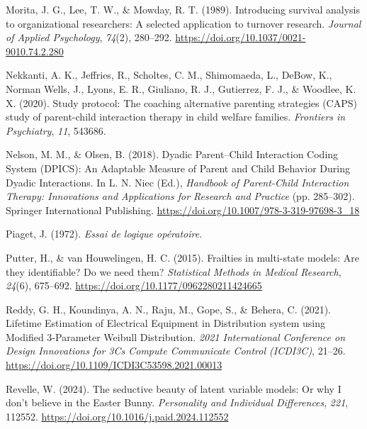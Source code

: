 \documentclass[12pt]{./styles/outhesis}
\begin{document}
\leavevmode{}%
Morita, J. G., Lee, T. W., \& Mowday, R. T. (1989). Introducing survival
analysis to organizational researchers: {A} selected application to
turnover research. \emph{Journal of Applied Psychology}, \emph{74}(2),
280--292. \url{https://doi.org/10.1037/0021-9010.74.2.280}

\leavevmode{}%
Nekkanti, A. K., Jeffries, R., Scholtes, C. M., Shimomaeda, L., DeBow,
K., Norman Wells, J., Lyons, E. R., Giuliano, R. J., Gutierrez, F. J.,
\& Woodlee, K. X. (2020). Study protocol: {The} coaching alternative
parenting strategies ({CAPS}) study of parent-child interaction therapy
in child welfare families. \emph{Frontiers in Psychiatry}, \emph{11},
543686.

\leavevmode{}%
Nelson, M. M., \& Olsen, B. (2018). Dyadic {Parent}--{Child Interaction
Coding System} ({DPICS}): {An Adaptable Measure} of {Parent} and {Child
Behavior During Dyadic Interactions}. In L. N. Niec (Ed.),
\emph{Handbook of {Parent-Child Interaction Therapy}: {Innovations} and
{Applications} for {Research} and {Practice}} (pp. 285--302). Springer
International Publishing.
\url{https://doi.org/10.1007/978-3-319-97698-3_18}

\leavevmode{}%
Piaget, J. (1972). \emph{Essai de logique op{é}ratoire}.

\leavevmode{}%
Putter, H., \& van Houwelingen, H. C. (2015). Frailties in multi-state
models: {Are} they identifiable? {Do} we need them? \emph{Statistical
Methods in Medical Research}, \emph{24}(6), 675--692.
\url{https://doi.org/10.1177/0962280211424665}

\leavevmode{}%
Reddy, G. H., Koundinya, A. N., Raju, M., Gope, S., \& Behera, C.
(2021). Lifetime {Estimation} of {Electrical Equipment} in
{Distribution} system using {Modified} 3-{Parameter Weibull
Distribution}. \emph{2021 {International Conference} on {Design
Innovations} for {3Cs Compute Communicate Control} ({ICDI3C})}, 21--26.
\url{https://doi.org/10.1109/ICDI3C53598.2021.00013}

\leavevmode{}%
Revelle, W. (2024). The seductive beauty of latent variable models: {Or}
why {I} don't believe in the {Easter Bunny}. \emph{Personality and
Individual Differences}, \emph{221}, 112552.
\url{https://doi.org/10.1016/j.paid.2024.112552}
\end{document}
